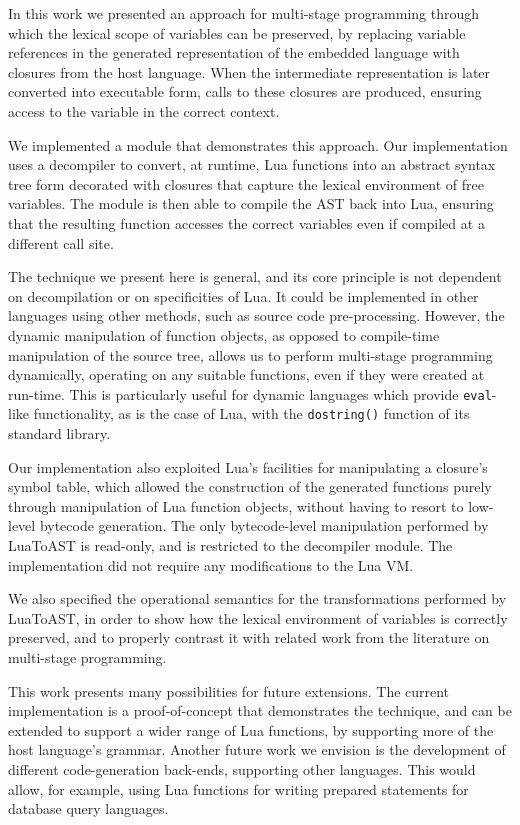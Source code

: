 \documentclass[english]{llncs}
\begin{document}
In this work we presented an approach for multi-stage programming through
which the lexical scope of variables can be preserved, by replacing
variable references in the generated representation of the embedded language
with closures from the host language. When the intermediate representation
is later converted into executable form, calls to these closures are
produced, ensuring access to the variable in the correct context.

We implemented a module that demonstrates this approach.
Our implementation uses a decompiler to convert, at runtime, Lua
functions into an abstract syntax tree form decorated with
closures that capture the lexical environment of free variables.
The module is then able to compile the AST back into Lua,
ensuring that the resulting function accesses the correct variables
even if compiled at a different call site.

The technique we present here is general, and its core principle
is not dependent on decompilation or on specificities of Lua.
It could be implemented in other languages using other methods,
such as source code pre-processing. However, the dynamic manipulation
of function objects, as opposed to compile-time manipulation of the
source tree, allows us to perform multi-stage programming dynamically,
operating on any suitable functions, even if they were created at run-time.
This is particularly useful for dynamic languages which provide
\texttt{eval}-like functionality, as is the case of Lua, with
the \texttt{dostring()} function of its standard library.

Our implementation also exploited Lua's facilities for manipulating
a closure's symbol table, which allowed the construction of the
generated functions purely through manipulation of Lua function
objects, without having to resort to low-level bytecode generation.
The only bytecode-level manipulation performed by LuaToAST is
read-only, and is restricted to the decompiler module. The
implementation did not require any modifications to the Lua VM.

We also specified the operational semantics for the transformations
performed by LuaToAST, in order to show how the lexical environment
of variables is correctly preserved, and to properly contrast it with
related work from the literature on multi-stage programming.

This work presents many possibilities for future extensions. The current
implementation is a proof-of-concept that demonstrates the technique,
and can be extended to support a wider range of Lua functions, by
supporting more of the host language's grammar. Another future work
we envision is the development of different code-generation back-ends,
supporting other languages. This would allow, for example, using
Lua functions for writing prepared statements for database query
languages.




\end{document}
